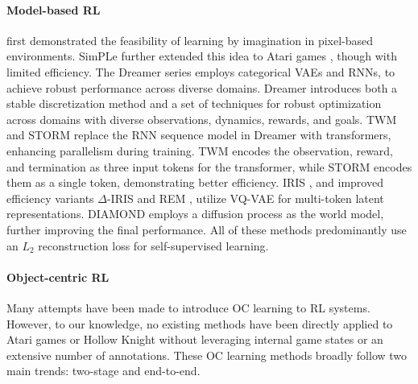 \documentclass{article} %
\begin{document}
\paragraph{Model-based RL}
\citet{ha_world_2018} first demonstrated the feasibility of learning by imagination in pixel-based environments.
SimPLe \citep{kaiser_model_2019} further extended this idea to Atari games \citep{bellemare_arcade_2013}, though with limited efficiency.
The Dreamer series \citep{hafner_learning_2019, hafner_mastering_2020, hafner_mastering_2023} employs categorical VAEs and RNNs, to achieve robust performance across diverse domains.
Dreamer introduces both a stable discretization method and a set of techniques for robust optimization across domains with diverse observations, dynamics, rewards, and goals.
TWM \citep{robine_transformer-based_2022} and STORM \citep{zhang_storm_2023} replace the RNN sequence model in Dreamer with transformers, enhancing parallelism during training.
TWM encodes the observation, reward, and termination as three input tokens for the transformer, while STORM encodes them as a single token, demonstrating better efficiency.
IRIS \citep{micheli_transformers_2022}, and improved efficiency variants $\Delta$-IRIS \citep{micheli_efficient_2024} and REM \citep{cohen_improving_2024}, utilize VQ-VAE \citep{van_den_oord_neural_2017} for multi-token latent representations.
DIAMOND \citep{alonso_diffusion_2024} employs a diffusion process as the world model, further improving the final performance.
All of these methods predominantly use an $L_2$ reconstruction loss for self-supervised learning.


\paragraph{Object-centric RL}
Many attempts have been made to introduce OC learning to RL systems.
However, to our knowledge, no existing methods have been directly applied to Atari games or Hollow Knight without leveraging internal game states or an extensive number of annotations.
These OC learning methods broadly follow two main trends: two-stage and end-to-end.
\end{document}
